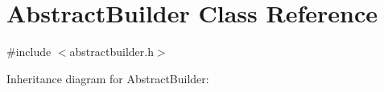 \hypertarget{class_abstract_builder}{}\section{Abstract\+Builder Class Reference}
\label{class_abstract_builder}


{\ttfamily \#include $<$abstractbuilder.\+h$>$}



Inheritance diagram for Abstract\+Builder\+:
